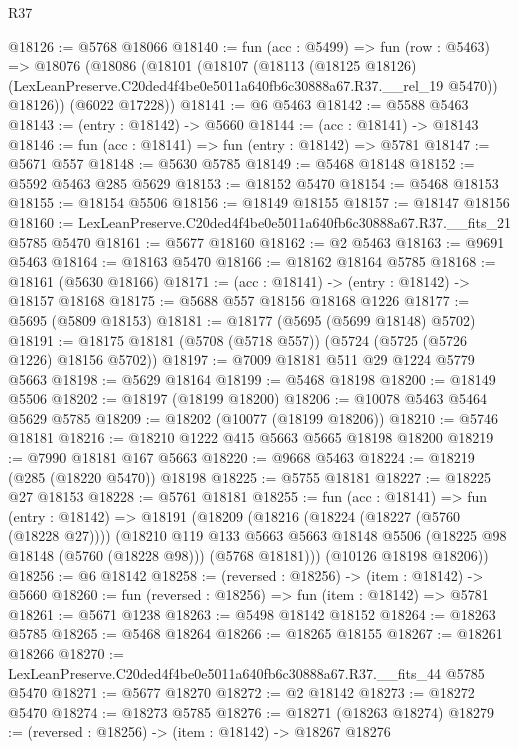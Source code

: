 \begin{lexlean}{R37}
\begin{coremodule}
@18126 := @5768 @18066
@18140 := fun (acc : @5499) =>
  fun (row : @5463) =>
  @18076
    (@18086
      (@18101
        (@18107
          (@18113
            (@18125 @18126)
            (LexLeanPreserve.C20ded4f4be0e5011a640fb6c30888a67.R37.__rel_19 @5470))
          @18126))
      (@6022 @17228))
@18141 := @6 @5463
@18142 := @5588 @5463
@18143 := (entry : @18142) -> @5660
@18144 := (acc : @18141) -> @18143
@18146 := fun (acc : @18141) => fun (entry : @18142) => @5781
@18147 := @5671 @557
@18148 := @5630 @5785
@18149 := @5468 @18148
@18152 := @5592 @5463 @285 @5629
@18153 := @18152 @5470
@18154 := @5468 @18153
@18155 := @18154 @5506
@18156 := @18149 @18155
@18157 := @18147 @18156
@18160 := LexLeanPreserve.C20ded4f4be0e5011a640fb6c30888a67.R37.__fits_21 @5785 @5470
@18161 := @5677 @18160
@18162 := @2 @5463
@18163 := @9691 @5463
@18164 := @18163 @5470
@18166 := @18162 @18164 @5785
@18168 := @18161 (@5630 @18166)
@18171 := (acc : @18141) -> (entry : @18142) -> @18157 @18168
@18175 := @5688 @557 @18156 @18168 @1226
@18177 := @5695 (@5809 @18153)
@18181 := @18177 (@5695 (@5699 @18148) @5702)
@18191 := @18175 @18181 (@5708 (@5718 @557)) (@5724 (@5725 (@5726 @1226) @18156 @5702))
@18197 := @7009 @18181 @511 @29 @1224 @5779 @5663
@18198 := @5629 @18164
@18199 := @5468 @18198
@18200 := @18149 @5506
@18202 := @18197 (@18199 @18200)
@18206 := @10078 @5463 @5464 @5629 @5785
@18209 := @18202 (@10077 (@18199 @18206))
@18210 := @5746 @18181
@18216 := @18210 @1222 @415 @5663 @5665 @18198 @18200
@18219 := @7990 @18181 @167 @5663
@18220 := @9668 @5463
@18224 := @18219 (@285 (@18220 @5470)) @18198
@18225 := @5755 @18181
@18227 := @18225 @27 @18153
@18228 := @5761 @18181
@18255 := fun (acc : @18141) =>
  fun (entry : @18142) =>
  @18191
    (@18209
      (@18216
        (@18224 (@18227 (@5760 (@18228 @27))))
        (@18210
          @119
          @133
          @5663
          @5663
          @18148
          @5506
          (@18225 @98 @18148 (@5760 (@18228 @98)))
          (@5768 @18181)))
      (@10126 @18198 @18206))
@18256 := @6 @18142
@18258 := (reversed : @18256) -> (item : @18142) -> @5660
@18260 := fun (reversed : @18256) => fun (item : @18142) => @5781
@18261 := @5671 @1238
@18263 := @5498 @18142 @18152
@18264 := @18263 @5785
@18265 := @5468 @18264
@18266 := @18265 @18155
@18267 := @18261 @18266
@18270 := LexLeanPreserve.C20ded4f4be0e5011a640fb6c30888a67.R37.__fits_44 @5785 @5470
@18271 := @5677 @18270
@18272 := @2 @18142
@18273 := @18272 @5470
@18274 := @18273 @5785
@18276 := @18271 (@18263 @18274)
@18279 := (reversed : @18256) -> (item : @18142) -> @18267 @18276

\end{coremodule}
\end{lexlean}

